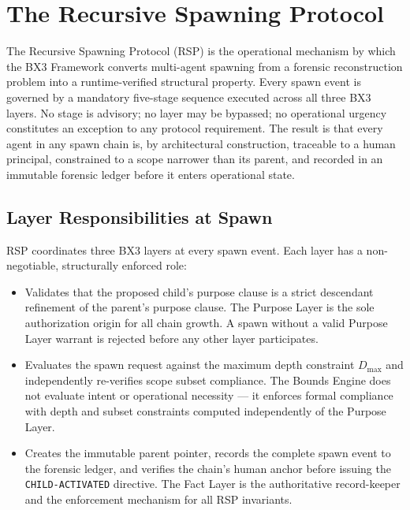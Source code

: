 \section{The Recursive Spawning Protocol}
\label{sec:rs-protocol}

The Recursive Spawning Protocol (RSP) is the operational mechanism by which the BX3 Framework converts multi-agent spawning from a forensic reconstruction problem into a runtime-verified structural property. Every spawn event is governed by a mandatory five-stage sequence executed across all three BX3 layers. No stage is advisory; no layer may be bypassed; no operational urgency constitutes an exception to any protocol requirement. The result is that every agent in any spawn chain is, by architectural construction, traceable to a human principal, constrained to a scope narrower than its parent, and recorded in an immutable forensic ledger before it enters operational state.

\subsection{Layer Responsibilities at Spawn}

RSP coordinates three BX3 layers at every spawn event. Each layer has a non-negotiable, structurally enforced role:

\begin{itemize}
  \item[\textbf{Purpose Layer.}] Validates that the proposed child's purpose clause is a strict descendant refinement of the parent's purpose clause. The Purpose Layer is the sole authorization origin for all chain growth. A spawn without a valid Purpose Layer warrant is rejected before any other layer participates.
  \item[\textbf{Bounds Engine.}] Evaluates the spawn request against the maximum depth constraint $D_{\max}$ and independently re-verifies scope subset compliance. The Bounds Engine does not evaluate intent or operational necessity — it enforces formal compliance with depth and subset constraints computed independently of the Purpose Layer.
  \item[\textbf{Fact Layer.}] Creates the immutable parent pointer, records the complete spawn event to the forensic ledger, and verifies the chain's human anchor before issuing the \texttt{CHILD-ACTIVATED} directive. The Fact Layer is the authoritative record-keeper and the enforcement mechanism for all RSP invariants.
\end{itemize}

